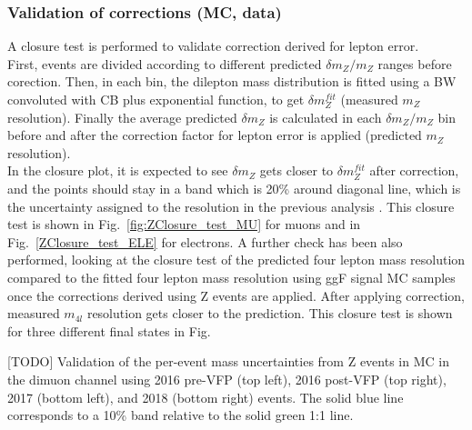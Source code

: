 \subsubsection{Validation of corrections (MC, data)}
\label{sec:ClosureTest}
A closure test is performed to validate correction derived for lepton \PT error. \\
First, events are divided according to different predicted $\delta m_{Z}/m_{Z}$ ranges before corection. 
Then, in each bin, the dilepton mass distribution is fitted using a BW convoluted with CB 
plus exponential function, to get $\delta m_{Z}^{fit}$ (measured $m_{Z}$ resolution). Finally 
the average predicted $\delta m_{Z}$ is calculated in each $\delta m_{Z}/m_{Z}$ bin before and after the 
correction factor for lepton \PT error is applied (predicted $m_{Z}$ resolution). \\
In the closure plot, it is expected to see $\delta m_{Z}$ gets closer to $\delta m_{Z}^{fit}$ 
after correction, and the points should stay in a band which is 20\% around diagonal line, which 
is the uncertainty assigned to the resolution in the previous analysis \cite{HIG_16_041}. 
This closure test is shown in Fig.~\ref{fig:ZClosure_test_MU} for muons and in Fig.~\ref{ZClosure_test_ELE} 
for electrons. A further check has been also performed, looking at the closure test of the predicted four lepton mass 
resolution compared to the fitted four lepton mass resolution using ggF signal MC samples once the 
corrections derived using Z events are applied. After applying correction, measured $m_{4l}$ 
resolution gets closer to the prediction. This closure test is shown for three different 
final states in Fig.%
\begin{multiFigure}
    \centering
        [TODO]
        {Validation of the per-event mass uncertainties from Z events in MC in the dimuon channel using 2016 pre-VFP (top left), 2016 post-VFP (top right), 2017 (bottom left), and 2018 (bottom right) events.
		The solid blue line corresponds to a 10\% band relative to the solid green 1:1 line.}
    \label{fig:ZClosure_test_MU}
\end{multiFigure}
